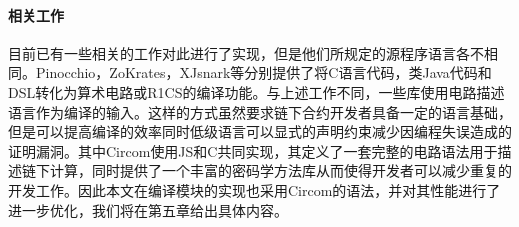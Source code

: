 \paragraph{相关工作} 目前已有一些相关的工作对此进行了实现，但是他们所规定的源程序语言各不相同。Pinocchio\cite{10.1145/2856449}，ZoKrates\cite{8726497}，XJsnark\cite{8418647}等分别提供了将C语言代码，类Java代码和DSL转化为算术电路或R1CS的编译功能。与上述工作不同，一些库\cite{libsnark, zexe}使用电路描述语言作为编译的输入。这样的方式虽然要求链下合约开发者具备一定的语言基础，但是可以提高编译的效率同时低级语言可以显式的声明约束减少因编程失误造成的证明漏洞。其中Circom\cite{circom}使用JS和C共同实现，其定义了一套完整的电路语法用于描述链下计算，同时提供了一个丰富的密码学方法库从而使得开发者可以减少重复的开发工作。因此本文在编译模块的实现也采用Circom的语法，并对其性能进行了进一步优化，我们将在第五章给出具体内容。
